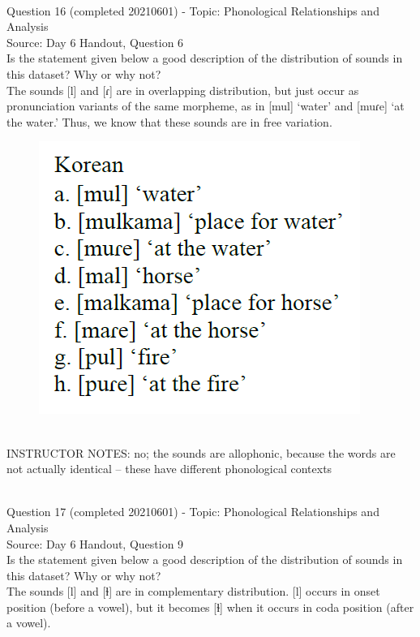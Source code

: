 \documentclass[12pt]{article}
\begin{document}
~\\

{\large Question 16} (completed 20210601) - Topic: Phonological Relationships and Analysis\\
Source: Day 6 Handout, Question 6\\

Is the statement given below a good description of the distribution of sounds in this dataset? Why or why not?\\

The sounds {[l]} and {[ɾ]} are in overlapping distribution, but just occur as pronunciation variants of the same morpheme, as in {[mul]} ‘water’ and {[muɾe]} ‘at the water.’ Thus, we know that these sounds are in free variation.

\begin{figure}[H]
\includegraphics{../images/korean.png}
\end{figure}

~\\
INSTRUCTOR NOTES: no; the sounds are allophonic, because the words are not actually identical -- these have different phonological contexts


~\\

{\large Question 17} (completed 20210601) - Topic: Phonological Relationships and Analysis\\
Source: Day 6 Handout, Question 9\\

Is the statement given below a good description of the distribution of sounds in this dataset? Why or why not?\\

The sounds {[l]} and {[ɫ]} are in complementary distribution. {[l]} occurs in onset position (before a vowel), but it becomes {[ɫ]} when it occurs in coda position (after a vowel).
\end{document}
